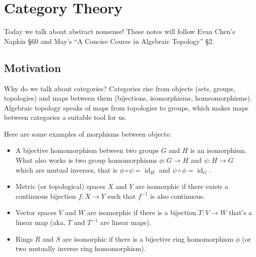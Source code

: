 \section{Category Theory}
Today we talk about abstract nonsense! These notes will follow Evan Chen's Napkin \S 60 and May's ``A Concise Course in Algebraic Topology'' \S 2.

\subsection{Motivation}
Why do we talk about categories? Categories rise from objects (sets, groups, topologies) and maps between them (bijections, isomorphisms, homeomorphisms). Algebraic topology speaks of maps from topologies to groups, which makes maps between categories a suitable tool for us.
\begin{example}
    Here are some examples of morphisms between objects:
    \begin{itemize}
        \item A bijective homomorphism between two groups $G$ and $H$ is an isomorphism. What also works is two group homomorphisms $\phi \colon G \to H$ and $\psi \colon H \to G$ which are mutual inverses, that is $\phi \circ \psi = \operatorname{id}_H$ and $\psi \circ \phi=\operatorname{id}_G$.
        \item Metric (or topological) spaces $X$ and  $Y$ are isomorphic if there exists a continuous bijection $f \colon  X \to Y$ such that $f^{-1}$ is also continuous.
        \item Vector spaces $V$ and $W$ are isomorphic if there is a bijection $T \colon V \to W$ that's a linear map (aka, $T$ and $T^{-1}$ are linear maps).
        \item Rings $R$ and $S$ are isomorphic if there is a bijective ring homomorphism $\phi$ (or two mutually inverse ring homomorphism).
    \end{itemize}
\end{example}

